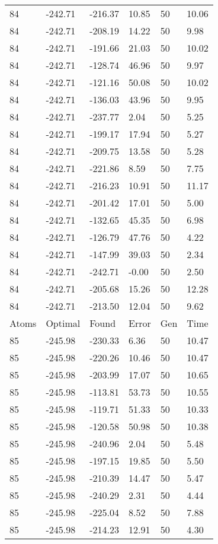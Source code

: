 \documentclass{report}
\begin{document}
\begin{appendix}
\begin{longtable}{llllll}
84 & -242.71 & -216.37 & 10.85 & 50 & 10.06 \\
84 & -242.71 & -208.19 & 14.22 & 50 & 9.98 \\
84 & -242.71 & -191.66 & 21.03 & 50 & 10.02 \\
84 & -242.71 & -128.74 & 46.96 & 50 & 9.97 \\
84 & -242.71 & -121.16 & 50.08 & 50 & 10.02 \\
84 & -242.71 & -136.03 & 43.96 & 50 & 9.95 \\
84 & -242.71 & -237.77 & 2.04 & 50 & 5.25 \\
84 & -242.71 & -199.17 & 17.94 & 50 & 5.27 \\
84 & -242.71 & -209.75 & 13.58 & 50 & 5.28 \\
84 & -242.71 & -221.86 & 8.59 & 50 & 7.75 \\
84 & -242.71 & -216.23 & 10.91 & 50 & 11.17 \\
84 & -242.71 & -201.42 & 17.01 & 50 & 5.00 \\
84 & -242.71 & -132.65 & 45.35 & 50 & 6.98 \\
84 & -242.71 & -126.79 & 47.76 & 50 & 4.22 \\
84 & -242.71 & -147.99 & 39.03 & 50 & 2.34 \\
84 & -242.71 & -242.71 & -0.00 & 50 & 2.50 \\
84 & -242.71 & -205.68 & 15.26 & 50 & 12.28 \\
84 & -242.71 & -213.50 & 12.04 & 50 & 9.62 \\
Atoms & Optimal & Found & Error & Gen & Time \\
85 & -245.98 & -230.33 & 6.36 & 50 & 10.47 \\
85 & -245.98 & -220.26 & 10.46 & 50 & 10.47 \\
85 & -245.98 & -203.99 & 17.07 & 50 & 10.65 \\
85 & -245.98 & -113.81 & 53.73 & 50 & 10.55 \\
85 & -245.98 & -119.71 & 51.33 & 50 & 10.33 \\
85 & -245.98 & -120.58 & 50.98 & 50 & 10.38 \\
85 & -245.98 & -240.96 & 2.04 & 50 & 5.48 \\
85 & -245.98 & -197.15 & 19.85 & 50 & 5.50 \\
85 & -245.98 & -210.39 & 14.47 & 50 & 5.47 \\
85 & -245.98 & -240.29 & 2.31 & 50 & 4.44 \\
85 & -245.98 & -225.04 & 8.52 & 50 & 7.88 \\
85 & -245.98 & -214.23 & 12.91 & 50 & 4.30 \\

\end{longtable}
\end{appendix}
\end{document}

